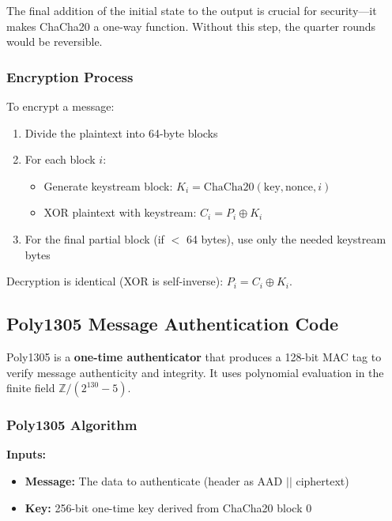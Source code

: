 \documentclass[11pt,a4paper]{article}
\begin{document}
\begin{notebox}
The final addition of the initial state to the output is crucial for security---it makes ChaCha20 a one-way function. Without this step, the quarter rounds would be reversible.
\end{notebox}

\subsubsection{Encryption Process}

To encrypt a message:

\begin{enumerate}[noitemsep]
    \item Divide the plaintext into 64-byte blocks
    \item For each block $i$:
    \begin{itemize}[noitemsep]
        \item Generate keystream block: $K_i = \text{ChaCha20}(\text{key}, \text{nonce}, i)$
        \item XOR plaintext with keystream: $C_i = P_i \oplus K_i$
    \end{itemize}
    \item For the final partial block (if $<$ 64 bytes), use only the needed keystream bytes
\end{enumerate}

Decryption is identical (XOR is self-inverse): $P_i = C_i \oplus K_i$.

\subsection{Poly1305 Message Authentication Code}

Poly1305 is a \textbf{one-time authenticator} that produces a 128-bit MAC tag to verify message authenticity and integrity. It uses polynomial evaluation in the finite field $\mathbb{Z}/(2^{130}-5)$.

\subsubsection{Poly1305 Algorithm}

\textbf{Inputs:}
\begin{itemize}[noitemsep]
    \item \textbf{Message:} The data to authenticate (header as AAD $||$ ciphertext)
    \item \textbf{Key:} 256-bit one-time key derived from ChaCha20 block 0
\end{itemize}
\end{document}
